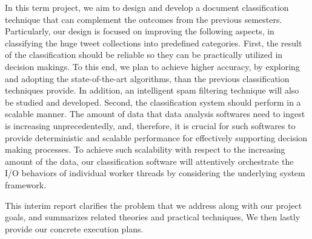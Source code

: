 
In this term project, we aim to design and develop a document classification technique
that can complement the outcomes from the previous semesters.
Particularly, our design is focused on improving the following aspects, in
classifying the huge tweet collections into predefined categories.
First, the result of the classification should be reliable so they can be
practically utilized in decision makings.
To this end, we plan to achieve higher accuracy, by exploring and adopting the
state-of-the-art algorithms, than the previous classification techniques
provide.
In addition, an intelligent spam filtering technique will also be studied and developed.
Second, the classification system should perform in a scalable manner.
The amount of data that data analysis softwares need to ingest is
increasing unprecedentedly, and, therefore, it is crucial for such softwares to
provide deterministic and scalable performance for effectively supporting
decision making processes.
To achieve such scalability with respect to the increasing amount of the data,
our classification software will attentively orchestrate the I/O behaviors of
individual worker threads by considering the underlying system framework.

This interim report clarifies the problem that we address along with our
project goals, and summarizes related theories and practical techniques,
We then lastly provide our concrete execution plans.

